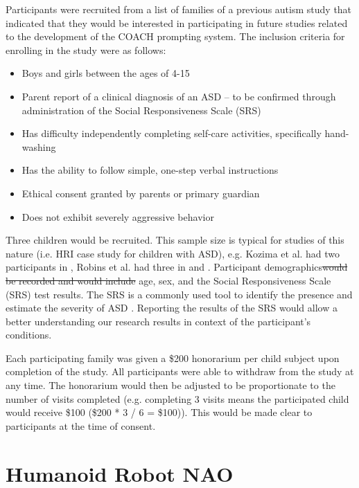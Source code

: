\documentclass{ut-thesis}
\providecommand{\DIFaddtex}[1]{{\protect\color{blue}\uwave{#1}}} %
\providecommand{\DIFdeltex}[1]{{\protect\color{red}\sout{#1}}}                      %
\providecommand{\DIFaddbegin}{} %
\providecommand{\DIFaddend}{} %
\providecommand{\DIFdelbegin}{} %
\providecommand{\DIFdelend}{} %
\providecommand{\DIFadd}[1]{\texorpdfstring{\DIFaddtex{#1}}{#1}} %
\providecommand{\DIFdel}[1]{\texorpdfstring{\DIFdeltex{#1}}{}} %
\begin{document}
Participants were recruited from a list of families of a previous autism study that indicated that they would be interested in participating in future studies related to the development of the COACH prompting system.  The inclusion criteria for enrolling in the study were as follows:
\begin{itemize}
	\item Boys and girls between the ages of 4-15 \DIFaddbegin \DIFadd{years
	}\DIFaddend \item Parent report of a clinical diagnosis of an ASD – to be confirmed through administration of the Social Responsiveness Scale (SRS)
	\item Has difficulty independently completing self-care activities, specifically hand-washing
	\item Has the ability to follow simple, one-step verbal instructions
	\item Ethical consent  granted by parents or primary guardian
	\item Does not exhibit severely aggressive behavior
\end{itemize}
Three children would be recruited. This sample size is typical for studies of this nature (i.e. HRI case study for children with ASD), e.g. Kozima et al. had two participants in
\cite{kozima2005interactive}, Robins et al. had three in \cite{robins2004robot} and \cite{robins2009isolation}.  Participant demographics\DIFdelbegin \DIFdel{would be recorded and would include }\DIFdelend \DIFaddbegin \DIFadd{, namely }\DIFaddend age, sex, and the Social Responsiveness Scale (SRS) test results\DIFaddbegin \DIFadd{, were recorded}\DIFaddend .  The SRS is a commonly used tool to identify the presence and estimate the severity of ASD \cite{constantino2002social}. Reporting the results of the SRS would allow a better understanding our research results in context of the participant's conditions.

Each participating family was given a \$200 honorarium per child subject upon completion of the study. All participants were able to withdraw from the study at any time. The honorarium would then be adjusted to be proportionate to the number of visits completed (e.g. completing 3 visits means the participated child would receive \$100 (\$200 * 3 / 6 = \$100)). This would be made clear to participants at the time of consent.
\section{Humanoid Robot NAO}
\end{document}
